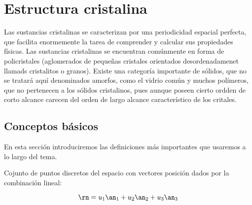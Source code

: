 \chapter{Estructura cristalina}

Las sustancias cristalinas se caracterizan por una periodicidad espacial perfecta, que facilita enormemente la tarea de comprender y calcular sus propiedades físicas. Las sustancias cristalinas se encuentran comúnmente en forma de policristales (aglomerados de pequeñas cristales orientados desordenadamenet llamads cristalitos o granos). Existe una categoría importante de sólidos, que no se tratará aquí denominados amorfos, como el vidrio común  y muchos polímeros, que no pertenecen a los sólidos cristalinos, pues aunque poseen cierto ordden de corto alcance carecen del orden de largo alcance característico de los critales.

\section{Conceptos básicos}

En esta sección introduciremos las definiciones más importantes que usaremos a lo largo del tema. \\

\begin{definition}[{\bf Red}]
    Cojunto de puntos discretos del espacio con vectores posición dados por la combinación lineal: 

    \begin{equation}
        \rn = u_1 \an_1 + u_2 \an_2 + u_3 \an_3
    \end{equation}
\end{definition}

